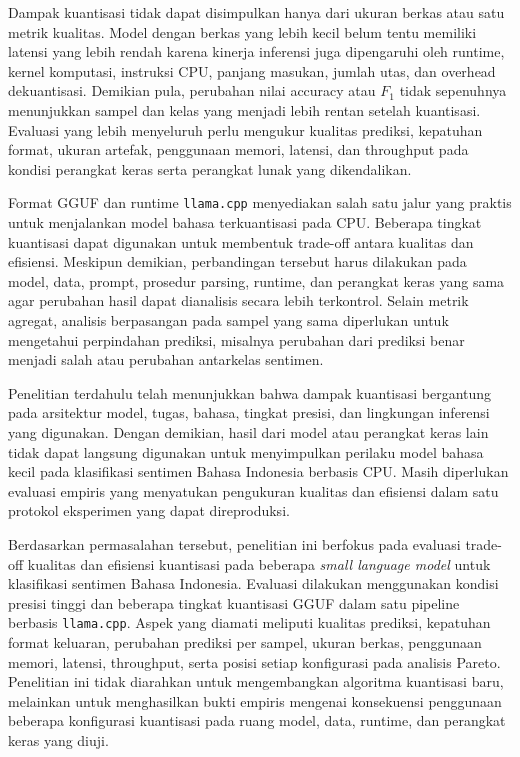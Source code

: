 Dampak kuantisasi tidak dapat disimpulkan hanya dari ukuran berkas atau satu metrik kualitas. Model dengan berkas yang lebih kecil belum tentu memiliki latensi yang lebih rendah karena kinerja inferensi juga dipengaruhi oleh runtime, kernel komputasi, instruksi CPU, panjang masukan, jumlah utas, dan overhead dekuantisasi. Demikian pula, perubahan nilai accuracy atau $F_1$ tidak sepenuhnya menunjukkan sampel dan kelas yang menjadi lebih rentan setelah kuantisasi. Evaluasi yang lebih menyeluruh perlu mengukur kualitas prediksi, kepatuhan format, ukuran artefak, penggunaan memori, latensi, dan throughput pada kondisi perangkat keras serta perangkat lunak yang dikendalikan.

Format GGUF dan runtime \texttt{llama.cpp} menyediakan salah satu jalur yang praktis untuk menjalankan model bahasa terkuantisasi pada CPU. Beberapa tingkat kuantisasi dapat digunakan untuk membentuk trade-off antara kualitas dan efisiensi. Meskipun demikian, perbandingan tersebut harus dilakukan pada model, data, prompt, prosedur parsing, runtime, dan perangkat keras yang sama agar perubahan hasil dapat dianalisis secara lebih terkontrol. Selain metrik agregat, analisis berpasangan pada sampel yang sama diperlukan untuk mengetahui perpindahan prediksi, misalnya perubahan dari prediksi benar menjadi salah atau perubahan antarkelas sentimen.

Penelitian terdahulu telah menunjukkan bahwa dampak kuantisasi bergantung pada arsitektur model, tugas, bahasa, tingkat presisi, dan lingkungan inferensi yang digunakan. Dengan demikian, hasil dari model atau perangkat keras lain tidak dapat langsung digunakan untuk menyimpulkan perilaku model bahasa kecil pada klasifikasi sentimen Bahasa Indonesia berbasis CPU. Masih diperlukan evaluasi empiris yang menyatukan pengukuran kualitas dan efisiensi dalam satu protokol eksperimen yang dapat direproduksi.

Berdasarkan permasalahan tersebut, penelitian ini berfokus pada evaluasi trade-off kualitas dan efisiensi kuantisasi pada beberapa \textit{small language model} untuk klasifikasi sentimen Bahasa Indonesia. Evaluasi dilakukan menggunakan kondisi presisi tinggi dan beberapa tingkat kuantisasi GGUF dalam satu pipeline berbasis \texttt{llama.cpp}. Aspek yang diamati meliputi kualitas prediksi, kepatuhan format keluaran, perubahan prediksi per sampel, ukuran berkas, penggunaan memori, latensi, throughput, serta posisi setiap konfigurasi pada analisis Pareto. Penelitian ini tidak diarahkan untuk mengembangkan algoritma kuantisasi baru, melainkan untuk menghasilkan bukti empiris mengenai konsekuensi penggunaan beberapa konfigurasi kuantisasi pada ruang model, data, runtime, dan perangkat keras yang diuji.

